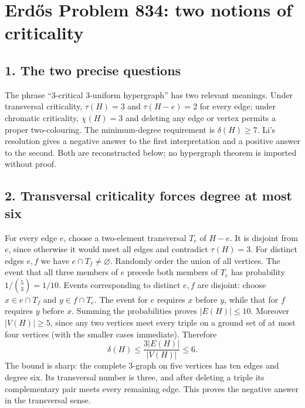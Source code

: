 \section*{Erd\H{o}s Problem 834: two notions of criticality}
\subsection*{1. The two precise questions}
The phrase ``3-critical 3-uniform hypergraph'' has two relevant meanings. Under transversal criticality, $\tau(H)=3$ and $\tau(H-e)=2$ for every edge; under chromatic criticality, $\chi(H)=3$ and deleting any edge or vertex permits a proper two-colouring. The minimum-degree requirement is $\delta(H)\ge7$. Li's resolution gives a negative answer to the first interpretation and a positive answer to the second. Both are reconstructed below; no hypergraph theorem is imported without proof.
\subsection*{2. Transversal criticality forces degree at most six}
For every edge $e$, choose a two-element transversal $T_e$ of $H-e$. It is disjoint from $e$, since otherwise it would meet all edges and contradict $\tau(H)=3$. For distinct edges $e,f$ we have $e\cap T_f\ne\varnothing$.
Randomly order the union of all vertices. The event that all three members of $e$ precede both members of $T_e$ has probability $1/\binom53=1/10$. Events corresponding to distinct $e,f$ are disjoint: choose $x\in e\cap T_f$ and $y\in f\cap T_e$. The event for $e$ requires $x$ before $y$, while that for $f$ requires $y$ before $x$. Summing the probabilities proves $|E(H)|\le10$.
Moreover $|V(H)|\ge5$, since any two vertices meet every triple on a ground set of at most four vertices (with the smaller cases immediate). Therefore
\[
 \delta(H)\le\frac{3|E(H)|}{|V(H)|}\le6.
\]
The bound is sharp: the complete 3-graph on five vertices has ten edges and degree six. Its transversal number is three, and after deleting a triple its complementary pair meets every remaining edge. This proves the negative answer in the transversal sense.
